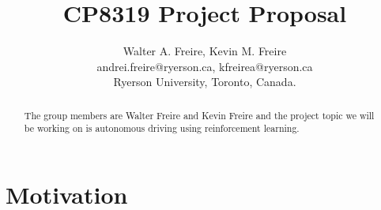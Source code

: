 \documentclass[journal]{IEEEtran}
\begin{document}
\title{CP8319 Project Proposal}
\author{Walter A. Freire, Kevin M. Freire\\
andrei.freire@ryerson.ca, kfreirea@ryerson.ca\\
Ryerson University, Toronto, Canada.}
\maketitle
\begin{abstract}
The group members are Walter Freire and Kevin Freire and the project topic we will be working on is autonomous driving using reinforcement learning.
\end{abstract}
\section{Motivation}


\end{document}
